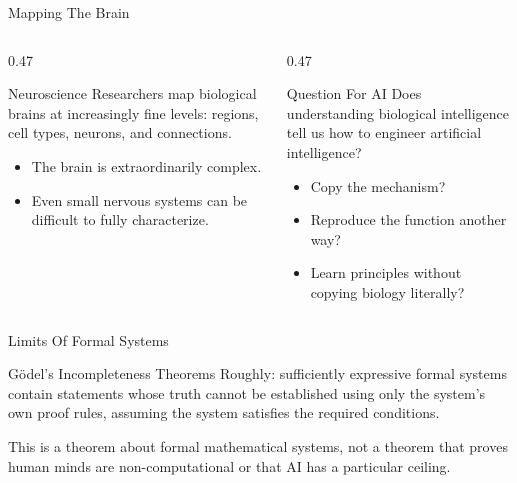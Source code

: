 \documentclass[aspectratio=169]{beamer}
\begin{document}
\begin{frame}[shrink=3]{Mapping The Brain}
  \begin{columns}[T,onlytextwidth]
    \begin{column}{0.47\textwidth}
      \begin{block}{Neuroscience}
        Researchers map biological brains at increasingly fine levels: regions, cell types, neurons, and connections.
      \end{block}
      \begin{itemize}
        \item The brain is extraordinarily complex.
        \item Even small nervous systems can be difficult to fully characterize.
      \end{itemize}
    \end{column}
    \begin{column}{0.47\textwidth}
      \begin{block}{Question For AI}
        Does understanding biological intelligence tell us how to engineer artificial intelligence?
      \end{block}
      \begin{itemize}
        \item Copy the mechanism?
        \item Reproduce the function another way?
        \item Learn principles without copying biology literally?
      \end{itemize}
    \end{column}
  \end{columns}
\end{frame}

\begin{frame}{Limits Of Formal Systems}
  \begin{block}{Gödel's Incompleteness Theorems}
    Roughly: sufficiently expressive formal systems contain statements whose truth cannot be established using only the system's own proof rules, assuming the system satisfies the required conditions.
  \end{block}
  \vspace{0.12in}
  \begin{keyidea}
    This is a theorem about formal mathematical systems, not a theorem that proves human minds are non-computational or that AI has a particular ceiling.
  \end{keyidea}
\end{frame}
\end{document}
